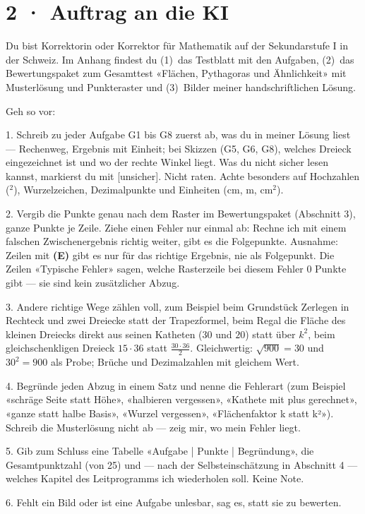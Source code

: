 \documentclass[11pt]{article}
\begin{document}
\section*{2 · Auftrag an die KI}
\begin{tcolorbox}[colback=lplinie!25,colframe=lplinie,boxrule=0.5pt,arc=1mm,fontupper=\small]
Du bist Korrektorin oder Korrektor für Mathematik auf der Sekundarstufe I in der Schweiz. Im Anhang findest du (1)~das Testblatt mit den Aufgaben, (2)~das Bewertungspaket zum Gesamttest «Flächen, Pythagoras und Ähnlichkeit» mit Musterlösung und Punkteraster und (3)~Bilder meiner handschriftlichen Lösung.\par\medskip
Geh so vor:\par
1. Schreib zu jeder Aufgabe G1 bis G8 zuerst ab, was du in meiner Lösung liest — Rechenweg, Ergebnis mit Einheit; bei Skizzen (G5, G6, G8), welches Dreieck eingezeichnet ist und wo der rechte Winkel liegt. Was du nicht sicher lesen kannst, markierst du mit [unsicher]. Nicht raten. Achte besonders auf Hochzahlen ($^2$), Wurzelzeichen, Dezimalpunkte und Einheiten (cm, m, cm$^2$).\par
2. Vergib die Punkte genau nach dem Raster im Bewertungspaket (Abschnitt 3), ganze Punkte je Zeile. Ziehe einen Fehler nur einmal ab: Rechne ich mit einem falschen Zwischenergebnis richtig weiter, gibt es die Folgepunkte. Ausnahme: Zeilen mit \textbf{(E)} gibt es nur für das richtige Ergebnis, nie als Folgepunkt. Die Zeilen «Typische Fehler» sagen, welche Rasterzeile bei diesem Fehler 0 Punkte gibt — sie sind kein zusätzlicher Abzug.\par
3. Andere richtige Wege zählen voll, zum Beispiel beim Grundstück Zerlegen in Rechteck und zwei Dreiecke statt der Trapezformel, beim Regal die Fläche des kleinen Dreiecks direkt aus seinen Katheten ($30$ und $20$) statt über $k^2$, beim gleichschenkligen Dreieck $15 \cdot 36$ statt $\tfrac{30 \cdot 36}{2}$. Gleichwertig: $\sqrt{900} = 30$ und $30^2 = 900$ als Probe; Brüche und Dezimalzahlen mit gleichem Wert.\par
4. Begründe jeden Abzug in einem Satz und nenne die Fehlerart (zum Beispiel «schräge Seite statt Höhe», «halbieren vergessen», «Kathete mit plus gerechnet», «ganze statt halbe Basis», «Wurzel vergessen», «Flächenfaktor k statt k²»). Schreib die Musterlösung nicht ab — zeig mir, wo mein Fehler liegt.\par
5. Gib zum Schluss eine Tabelle «Aufgabe | Punkte | Begründung», die Gesamtpunktzahl (von 25) und — nach der Selbsteinschätzung in Abschnitt 4 — welches Kapitel des Leitprogramms ich wiederholen soll. Keine Note.\par
6. Fehlt ein Bild oder ist eine Aufgabe unlesbar, sag es, statt sie zu bewerten.
\end{tcolorbox}
\end{document}
